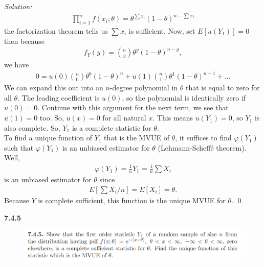 \documentclass{book}
\theoremstyle{definition}
\newcommand{\f}[2]{\frac{#1}{#2}}
\begin{document}
\noindent \textit{Solution:}
\begin{align*}
\prod^n_{i=1}f(x_i;\theta) = \theta^{\sum x_i} (1-\theta)^{n-\sum x_i}
\end{align*}
the factorization theorem tells us $\sum x_i$ is sufficient. Now, set $E[u(Y_1)] = 0$ then because
\begin{align}
f_Y(y) = {{n}\choose{y}}\theta^y (1-\theta)^{n-y},
\end{align}
we have
\begin{align}
0 = u(0){{n}\choose{0}} \theta^0 (1-\theta)^n + u(1) {{n}\choose{1}} \theta^1 (1-\theta)^{n-1} + \dots
\end{align}
We can expand this out into an $n$-degree polynomial in $\theta$ that is equal to zero for all $\theta$. The leading coefficient is $u(0)$, so the polynomial is identically zero if $u(0) = 0$. Continue with this argument for the next term, we see that $u(1) = 0$ too. So, $u(x) = 0$ for all natural $x$. This means $u(Y_1) = 0$, so $Y_1$ is also complete. So, $Y_1$ is a complete statistic for $\theta$. \\

To find a unique function of $Y_1$ that is the MVUE of $\theta$, it suffices to find $\varphi(Y_1)$ such that $\varphi(Y_1)$ is an unbiased estimator for $\theta$ (Lehmann-Scheff\'e theorem).  Well,
\begin{align*}
\varphi(Y_1) = \f{1}{n}Y_1 = \f{1}{n}\sum X_i
\end{align*}
is an unbiased estimator for $\theta$ since
\begin{align*}
E[\sum X_i/n] = E[X_i] = \theta.
\end{align*}
Because $Y$ is complete sufficient, this function is the unique MVUE for $\theta$. \qed




\newpage





\noindent\textbf{7.4.5}
\begin{figure}[!htb]
	\centering
	\includegraphics[scale=1]{745}
\end{figure}
\end{document}
